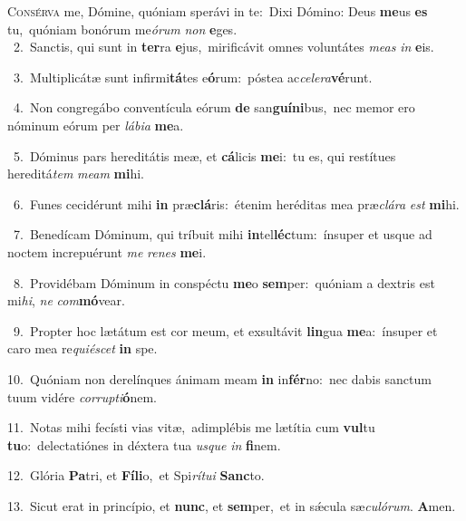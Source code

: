 \lettrine{\initial\textcolor{\initialcolor}{C}}{onsérva} me, Dómine, quóniam sperávi in te:~\dagger Dixi Dómino: Deus \textbf{me}\-us \textbf{es} tu,~\star quóniam bonórum me\-\textit{ó}\-\textit{rum} \textit{non} \textbf{e}\-ges.\\
{\numbfont\textcolor{\numbcolor}{~2.}}~Sanctis, qui sunt in \textbf{ter}\-ra \textbf{e}\-jus,~\star mirificávit omnes voluntátes \textit{me}\-\textit{as} \textit{in} \textbf{e}\-is.\par
{\numbfont\textcolor{\numbcolor}{~3.}}~Multiplicátæ sunt infirmi\-\textbf{tá}\-tes e\-\textbf{ó}\-rum:~\star póstea ac\-\textit{ce}\-\textit{le}\textit{ra}\textbf{vé}runt.\par
{\numbfont\textcolor{\numbcolor}{~4.}}~Non congregábo conventícula eórum \textbf{de} san\-\textbf{guí}\-\textbf{ni}bus,~\star nec memor ero nóminum eórum per \textit{lá}\-\textit{bi}\textit{a} \textbf{me}\-a.\par
{\numbfont\textcolor{\numbcolor}{~5.}}~Dóminus pars hereditátis meæ, et \textbf{cá}\-licis \textbf{me}\-i:~\star tu es, qui restítues hereditá\textit{tem} \textit{me}\-\textit{am} \textbf{mi}\-hi.\par
{\numbfont\textcolor{\numbcolor}{~6.}}~Funes cecidérunt mihi \textbf{in} præ\-\textbf{clá}\-ris:~\star étenim heréditas mea præ\-\textit{clá}\-\textit{ra} \textit{est} \textbf{mi}\-hi.\par
{\numbfont\textcolor{\numbcolor}{~7.}}~Benedícam Dóminum, qui tríbuit mihi \textbf{in}\-tel\-\textbf{léc}\-tum:~\star ínsuper et usque ad noctem increpuérunt \textit{me} \textit{re}\-\textit{nes} \textbf{me}\-i.\par
{\numbfont\textcolor{\numbcolor}{~8.}}~Providébam Dóminum in conspéctu \textbf{me}\-o \textbf{sem}\-per:~\star quóniam a dextris est mi\-\textit{hi}\-, \textit{ne} \textit{com}\-\textbf{mó}vear.\par
{\numbfont\textcolor{\numbcolor}{~9.}}~Propter hoc lætátum est cor meum, et exsultávit \textbf{lin}\-gua \textbf{me}\-a:~\star ínsuper et caro mea re\-\textit{qui}\-\textit{é}\textit{scet} \textbf{in} spe.\par
{\numbfont\textcolor{\numbcolor}{10.}}~Quóniam non derelínques ánimam meam \textbf{in} in\-\textbf{fér}\-no:~\star nec dabis sanctum tuum vidére \textit{cor}\-\textit{rup}\textit{ti}\textbf{ó}nem.\par
{\numbfont\textcolor{\numbcolor}{11.}}~Notas mihi fecísti vias vitæ,~\dagger adimplébis me lætítia cum \textbf{vul}\-tu \textbf{tu}\-o:~\star delectatiónes in déxtera tua \textit{us}\-\textit{que} \textit{in} \textbf{fi}\-nem.\par
{\numbfont\textcolor{\numbcolor}{12.}}~Glória \textbf{Pa}\-tri, et \textbf{Fí}\-\textbf{li}o,~\star et Spi\-\textit{rí}\-\textit{tu}\textit{i} \textbf{Sanc}\-to.\par
{\numbfont\textcolor{\numbcolor}{13.}}~Sicut erat in princípio, et \textbf{nunc}\-, et \textbf{sem}\-per,~\star et in sǽcula sæ\-\textit{cu}\-\textit{ló}\textit{rum}. \textbf{A}\-men.\par
